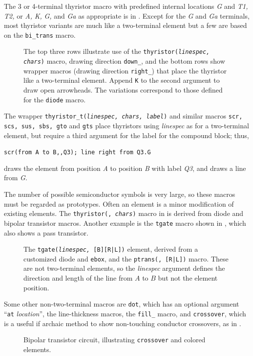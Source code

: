 The 3 or 4-terminal thyristor macro with predefined internal locations
 {\sl G} and {\sl T1,} {\sl T2,} or
 {\sl A,} {\sl K,} {\sl G,} and {\sl Ga} 
 as appropriate is in .
Except for the {\sl G} and {\sl Ga} terminals,
most thyristor variants are
much like a two-terminal element but a few are based on the
{\tt bi\_trans} macro.
\begin{figure}[ht]
   
   \vspace*{-1ex}
   \caption{The top three rows illustrate use of the
    {\tt thyristor({\sl linespec, chars})} macro,
    drawing direction {\tt down\_}, and the bottom rows show wrapper
    macros (drawing direction {\tt right\_}) that place
    the thyristor like a two-terminal element. Append {\tt K}
    to the second argument to draw open arrowheads.  The variations
    correspond to those defined for the {\tt diode} macro.}
   \label{Thyristor}
   \end{figure}
The wrapper
{\tt thyristor\_t({\sl linespec, chars, label})} and similar macros
{\tt scr, scs, sus, sbs, gto} and {\tt gts}
place thyristors using {\sl linespec} as for a two-terminal element,
but require a third argument for the label for the compound block; thus,

{\tt scr(from A to B,{,}Q3); line right from Q3.G}

\noindent
draws the element from position {\sl A} to position {\sl B} with label
{\sl Q3}, and draws a line from {\sl G}.

The number of possible semiconductor symbols is very
large, so these macros must be regarded as prototypes.
Often an element is a minor modification of existing elements.
The {\tt thyristor(\linespec, {\sl chars})} macro in
 is derived from diode and bipolar transistor macros.
Another example is the {\tt tgate} macro shown in , which
also shows a pass transistor.
\begin{figure}[H]
\vspace*{-\baselineskip}
   
   \caption{The {\tt tgate({\sl linespec,} [B][R|L])} element, derived from
     a customized diode and {\tt ebox}, and the
     {\tt ptrans(\linespec, [R|L])} macro.
     These are not two-terminal elements, so the {\sl linespec} argument
     defines the direction and length of the line from $A$ to $B$ but not
     the element position.}
   \label{Tgate}
   \end{figure}

Some other non-two-terminal macros are {\tt dot}, which has an
optional argument ``{\tt at} {\sl location}'', the line-thickness
macros, the {\tt fill\_} macro, and {\tt crossover}, which is a useful if
archaic method to show non-touching conductor crossovers, as in
.
\begin{figure}[H]
   
   \caption{Bipolar transistor circuit, illustrating {\tt crossover}
      and colored elements.}
   \label{bistable}
   \end{figure}

